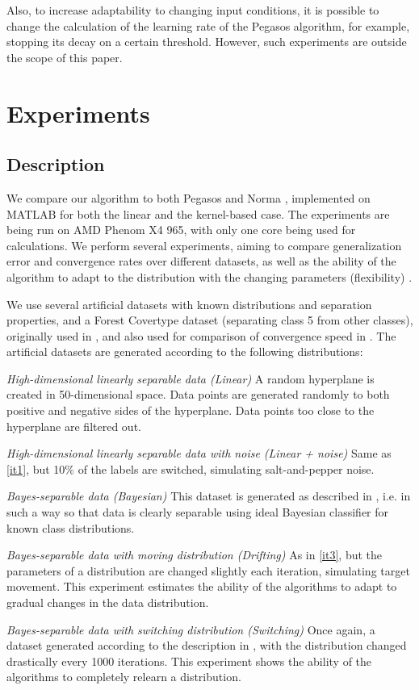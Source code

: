 \documentclass[10pt,twocolumn, a4paper]{article}
\begin{document}
Also, to increase adaptability to changing input conditions, it is possible to change the calculation of the learning rate of the Pegasos algorithm, for example, stopping its decay on a certain threshold. However, such experiments are outside the scope of this paper. 
\section{Experiments}
\label{Compare}
\subsection{Description}
We compare our algorithm to both Pegasos \cite{Pegasos} and Norma \cite{Norma}, implemented on MATLAB for both the linear and the kernel-based case. The experiments are being run on AMD Phenom X4 965, with only one core being used for calculations. We perform several experiments, aiming to compare generalization error and convergence rates over different datasets, as well as the ability of the algorithm to adapt to the distribution with the changing parameters (flexibility) . 

We use several artificial datasets with known distributions and separation properties, and a Forest Covertype dataset (separating class 5 from other classes), originally used in \cite{Forest}, and also used for comparison of convergence speed in \cite{Pegasos}. The artificial datasets are generated  according to the following distributions:

\begin{enumerate*}
  \item \emph{High-dimensional linearly separable data (Linear)} \label{it1} A random hyperplane is created in 50-dimensional space. Data points are generated randomly to both positive and negative sides of the hyperplane. Data points too close to the hyperplane are filtered out. 
  \item \emph{High-dimensional linearly separable data with noise (Linear + noise)} Same as \ref{it1}, but 10\% of the labels are switched, simulating salt-and-pepper noise.
  \item \emph{Bayes-separable data (Bayesian)} \label{it3} This dataset is generated as described in \cite{Norma}, i.e. in such a way so that data is clearly separable using ideal Bayesian classifier for known class distributions.
  \item \emph{Bayes-separable data with moving distribution (Drifting)} As in \ref{it3}, but the parameters of a distribution are changed slightly each iteration, simulating target movement. This experiment estimates  the ability of the algorithms to adapt to gradual changes in the data distribution.
  \item \emph{Bayes-separable data with switching distribution (Switching)} Once again, a dataset generated according to the description in \cite{Norma}, with the distribution changed drastically every 1000 iterations. This experiment shows the ability of the algorithms to completely relearn a distribution. 
\end{enumerate*}
\end{document}
